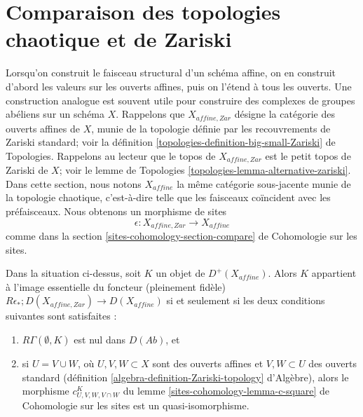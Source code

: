 \section{Comparaison des topologies chaotique et de Zariski}
\label{section-compare-chaotic-Zariski}

\noindent
Lorsqu'on construit le faisceau structural d'un schéma affine, on en construit d'abord
les valeurs sur les ouverts affines, puis on l'étend à tous les ouverts.
Une construction analogue est souvent utile pour construire des complexes
de groupes abéliens sur un schéma $X$. Rappelons que $X_{affine, Zar}$
désigne la catégorie des ouverts affines de $X$, munie de la topologie définie
par les recouvrements de Zariski standard; voir la
définition \ref{topologies-definition-big-small-Zariski} de Topologies.
Rappelons au lecteur que le topos de $X_{affine, Zar}$
est le petit topos de Zariski de $X$; voir le lemme de Topologies
\ref{topologies-lemma-alternative-zariski}.
Dans cette section, nous notons $X_{affine}$ la même catégorie
sous-jacente munie de la topologie chaotique, c'est-à-dire telle que les faisceaux
coïncident avec les préfaisceaux. Nous obtenons un morphisme de sites
$$
\epsilon : X_{affine, Zar} \longrightarrow X_{affine}
$$
comme dans la section \ref{sites-cohomology-section-compare} de Cohomologie sur les sites.

\begin{lemma}
\label{lemma-check-zar}
Dans la situation ci-dessus, soit $K$ un objet de $D^+(X_{affine})$.
Alors $K$ appartient à l'image essentielle du foncteur (pleinement fidèle)
$R\epsilon_* ; D(X_{affine, Zar}) \to D(X_{affine})$ si et seulement
si les deux conditions suivantes sont satisfaites :
\begin{enumerate}
\item $R\Gamma(\emptyset, K)$ est nul dans $D(\textit{Ab})$, et
\item si $U = V \cup W$, où $U, V, W \subset X$ sont des ouverts affines et
$V, W \subset U$ des ouverts standard
(définition \ref{algebra-definition-Zariski-topology} d'Algèbre), alors
le morphisme $c^K_{U, V, W, V \cap W}$ du
lemme \ref{sites-cohomology-lemma-c-square} de Cohomologie sur les sites
est un quasi-isomorphisme.
\end{enumerate}
\end{lemma}

